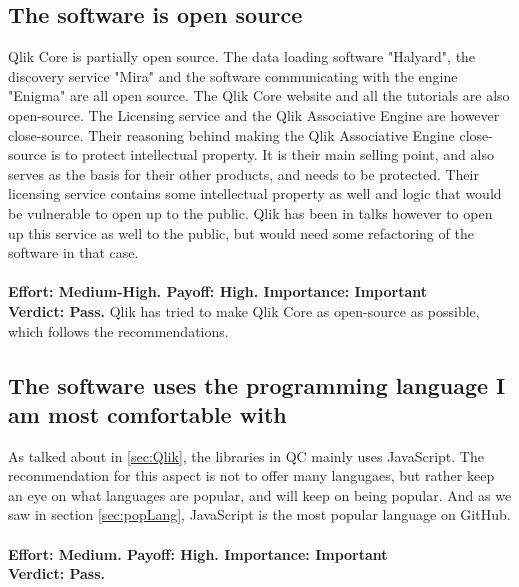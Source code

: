 \documentclass{cslthse-msc}
\begin{document}
    \subsection{The software is open source}
    Qlik Core is partially open source. The data loading software "Halyard", the discovery service "Mira" and the software communicating with the engine "Enigma" are all open source. The Qlik Core website and all the tutorials are also open-source. The Licensing service and the Qlik Associative Engine are however close-source. Their reasoning behind making the Qlik Associative Engine close-source is to protect intellectual property. It is their main selling point, and also serves as the basis for their other products, and needs to be protected. Their licensing service contains some intellectual property as well and logic that would be vulnerable to open up to the public. Qlik has been in talks however to open up this service as well to the public, but would need some refactoring of the software in that case.\\\\
    \textbf{Effort: Medium-High. Payoff: High. Importance: Important}\\
    \textbf{Verdict: Pass.} Qlik has tried to make Qlik Core as open-source as possible, which follows the recommendations.
    \subsection{The software uses the programming language I am most comfortable with}
    As talked about in \ref{sec:Qlik}, the libraries in QC mainly uses JavaScript. The recommendation for this aspect is not to offer many langugaes, but rather keep an eye on what languages are popular, and will keep on being popular. And as we saw in section \ref{sec:popLang}, JavaScript is the most popular language on GitHub. \\\\
    \textbf{Effort: Medium. Payoff: High. Importance: Important}\\
    \textbf{Verdict: Pass.}
\end{document}
